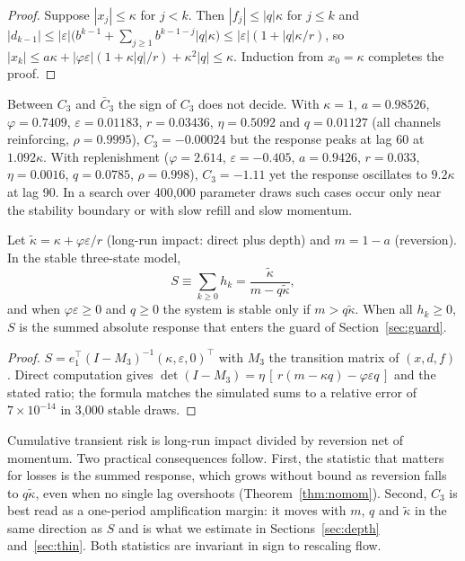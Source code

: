 \begin{proof}
Suppose $|x_j|\le\kappa$ for $j<k$. Then $|f_j|\le|q|\kappa$ for $j\le k$ and $|d_{k-1}|\le|\varepsilon|\bigl(b^{k-1}+\sum_{j\ge1}b^{k-1-j}|q|\kappa\bigr)\le|\varepsilon|(1+|q|\kappa/r)$, so $|x_k|\le a\kappa+|\varphi\varepsilon|(1+\kappa|q|/r)+\kappa^2|q|\le\kappa$. Induction from $x_0=\kappa$ completes the proof.
\end{proof}

\begin{remark}\label{rem:counter}
Between $C_3$ and $\bar C_3$ the sign of $C_3$ does not decide. With $\kappa=1$, $a=0.98526$, $\varphi=0.7409$, $\varepsilon=0.01183$, $r=0.03436$, $\eta=0.5092$ and $q=0.01127$ (all channels reinforcing, $\rho=0.9995$), $C_3=-0.00024$ but the response peaks at lag 60 at $1.092\kappa$. With replenishment ($\varphi=2.614$, $\varepsilon=-0.405$, $a=0.9426$, $r=0.033$, $\eta=0.0016$, $q=0.0785$, $\rho=0.998$), $C_3=-1.11$ yet the response oscillates to $9.2\kappa$ at lag 90. In a search over 400{,}000 parameter draws such cases occur only near the stability boundary or with slow refill and slow momentum.
\end{remark}

\begin{proposition}\label{prop:sum}
Let $\tilde\kappa=\kappa+\varphi\varepsilon/r$ (long-run impact: direct plus depth) and $m=1-a$ (reversion). In the stable three-state model,
\[
S\equiv\sum_{k\ge0}h_k=\frac{\tilde\kappa}{m-q\tilde\kappa},
\]
and when $\varphi\varepsilon\ge0$ and $q\ge0$ the system is stable only if $m>q\tilde\kappa$. When all $h_k\ge0$, $S$ is the summed absolute response that enters the guard of Section~\ref{sec:guard}.
\end{proposition}

\begin{proof}
$S=e_1^\top(I-M_3)^{-1}(\kappa,\varepsilon,0)^\top$ with $M_3$ the transition matrix of $(x,d,f)$. Direct computation gives $\det(I-M_3)=\eta\,[\,r(m-\kappa q)-\varphi\varepsilon q\,]$ and the stated ratio; the formula matches the simulated sums to a relative error of $7\times10^{-14}$ in 3{,}000 stable draws.
\end{proof}

Cumulative transient risk is long-run impact divided by reversion net of momentum. Two practical consequences follow. First, the statistic that matters for losses is the summed response, which grows without bound as reversion falls to $q\tilde\kappa$, even when no single lag overshoots (Theorem~\ref{thm:nomom}). Second, $C_3$ is best read as a one-period amplification margin: it moves with $m$, $q$ and $\tilde\kappa$ in the same direction as $S$ and is what we estimate in Sections~\ref{sec:depth} and~\ref{sec:thin}. Both statistics are invariant in sign to rescaling flow.


